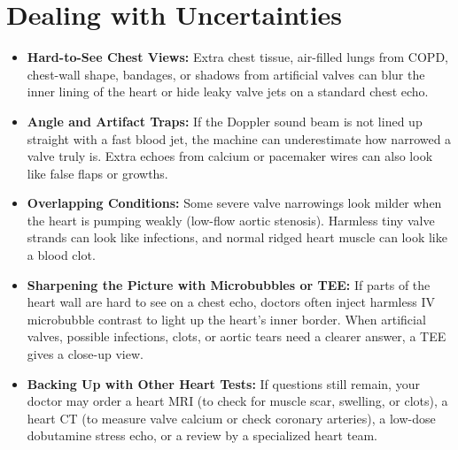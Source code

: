 \section{Dealing with Uncertainties}
\begin{itemize}
\item \textbf{Hard-to-See Chest Views:} Extra chest tissue, air-filled lungs from COPD, chest-wall shape, bandages, or shadows from artificial valves can blur the inner lining of the heart or hide leaky valve jets on a standard chest echo.
\item \textbf{Angle and Artifact Traps:} If the Doppler sound beam is not lined up straight with a fast blood jet, the machine can underestimate how narrowed a valve truly is. Extra echoes from calcium or pacemaker wires can also look like false flaps or growths.
\item \textbf{Overlapping Conditions:} Some severe valve narrowings look milder when the heart is pumping weakly (low-flow aortic stenosis). Harmless tiny valve strands can look like infections, and normal ridged heart muscle can look like a blood clot.
\item \textbf{Sharpening the Picture with Microbubbles or TEE:} If parts of the heart wall are hard to see on a chest echo, doctors often inject harmless IV microbubble contrast to light up the heart's inner border. When artificial valves, possible infections, clots, or aortic tears need a clearer answer, a TEE gives a close-up view.
\item \textbf{Backing Up with Other Heart Tests:} If questions still remain, your doctor may order a heart MRI (to check for muscle scar, swelling, or clots), a heart CT (to measure valve calcium or check coronary arteries), a low-dose dobutamine stress echo, or a review by a specialized heart team.
\end{itemize}


